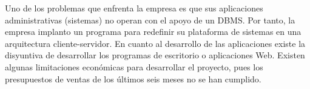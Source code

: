 \documentclass{article}
\begin{document}
Uno de los problemas que enfrenta la empresa es que sus aplicaciones administrativas
(sistemas) no operan con el apoyo de un DBMS. Por tanto, la empresa implanto un
programa para redefinir su plataforma de sistemas en una arquitectura cliente-servidor.
En cuanto al desarrollo de las aplicaciones existe la disyuntiva de desarrollar los programas
de escritorio o aplicaciones Web. Existen algunas limitaciones económicas para
desarrollar el proyecto, pues los presupuestos de ventas de los últimos seis meses no se han
cumplido.
\end{document}
